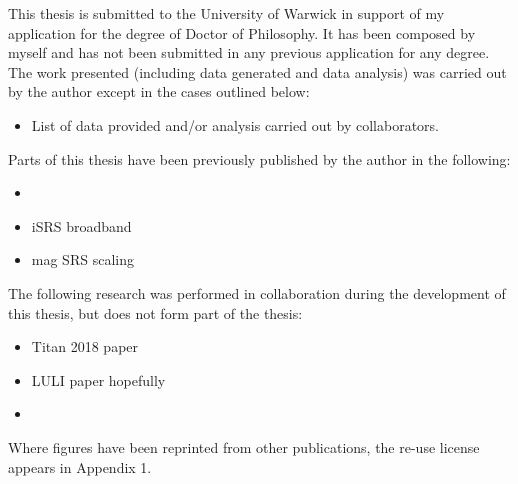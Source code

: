 
\begin{thesisdeclaration}
%

This thesis is submitted to the University of Warwick in support of my application for the degree of Doctor of Philosophy. It has been composed by myself and has not been submitted in any previous application for any degree. \\


\noindent The work presented (including data generated and data analysis) was carried out by the author except in the cases outlined below:
\begin{singlespacing}
\begin{itemize}
    \item List of data provided and/or analysis carried out by collaborators.
\end{itemize}{}
\end{singlespacing}

\noindent Parts of this thesis have been previously published by the author in the following:
\begin{singlespacing}
\begin{itemize}
    \item {}
    \item iSRS broadband
    \item mag SRS scaling
\end{itemize}{}
\end{singlespacing}

\noindent The following research was performed in collaboration during the development of this thesis, but does not form part of the thesis:
\begin{singlespacing}
\begin{itemize}
    \item Titan 2018 paper
    \item LULI paper hopefully
    \item {}

\end{itemize}
\end{singlespacing}

\noindent Where figures have been reprinted from other publications, the re-use license appears in Appendix 1.

\end{thesisdeclaration}
